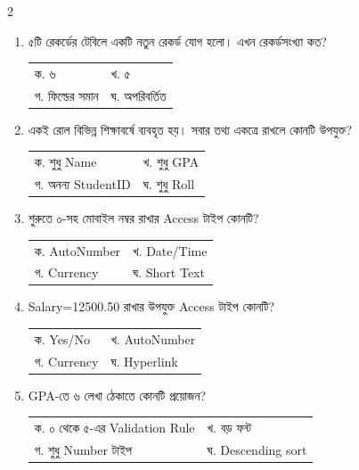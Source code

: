 \begin{multicols}{2}
\begin{enumerate}[resume]
\item \begin{minipage}[t]{\linewidth}
৫টি রেকর্ডের টেবিলে একটি নতুন রেকর্ড যোগ হলো। এখন রেকর্ডসংখ্যা কত?
\par
\begin{tabularx}{\linewidth}{@{}X X@{}}
ক. ৬ & খ. ৫ \\
গ. ফিল্ডের সমান & ঘ. অপরিবর্তিত \\
\end{tabularx}
\end{minipage}
\vspace{1pt}

\item \begin{minipage}[t]{\linewidth}
একই রোল বিভিন্ন শিক্ষাবর্ষে ব্যবহৃত হয়। সবার তথ্য একত্রে রাখলে কোনটি উপযুক্ত?
\par
\begin{tabularx}{\linewidth}{@{}X X@{}}
ক. শুধু Name & খ. শুধু GPA \\
গ. অনন্য StudentID & ঘ. শুধু Roll \\
\end{tabularx}
\end{minipage}
\vspace{1pt}

\item \begin{minipage}[t]{\linewidth}
শুরুতে ০-সহ মোবাইল নম্বর রাখার Access টাইপ কোনটি?
\par
\begin{tabularx}{\linewidth}{@{}X X@{}}
ক. AutoNumber & খ. Date/Time \\
গ. Currency & ঘ. Short Text \\
\end{tabularx}
\end{minipage}
\vspace{1pt}

\item \begin{minipage}[t]{\linewidth}
Salary=12500.50 রাখার উপযুক্ত Access টাইপ কোনটি?
\par
\begin{tabularx}{\linewidth}{@{}X X@{}}
ক. Yes/No & খ. AutoNumber \\
গ. Currency & ঘ. Hyperlink \\
\end{tabularx}
\end{minipage}
\vspace{1pt}

\item \begin{minipage}[t]{\linewidth}
GPA-তে ৬ লেখা ঠেকাতে কোনটি প্রয়োজন?
\par
\begin{tabularx}{\linewidth}{@{}X X@{}}
ক. ০ থেকে ৫-এর Validation Rule & খ. বড় ফন্ট \\
গ. শুধু Number টাইপ & ঘ. Descending sort \\
\end{tabularx}
\end{minipage}
\vspace{1pt}


\end{enumerate}
\end{multicols}
